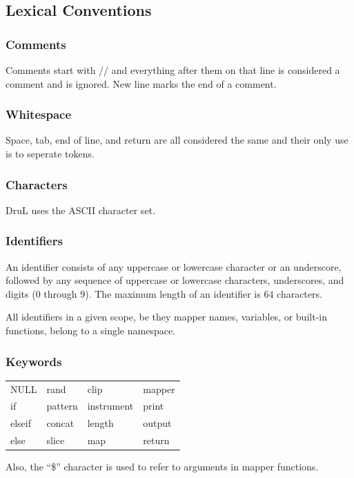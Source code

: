 \documentclass[11pt,twoside]{article}
\begin{document}
\subsection{Lexical Conventions}

\subsubsection{Comments}

Comments start with // and everything after them on that line
is considered a comment and is ignored. New line marks the end
of a comment.

\subsubsection{Whitespace}

Space, tab, end of line, and return are all considered the same 
and their only use is to seperate tokens.

\subsubsection{Characters}

DruL uses the ASCII character set.

\subsubsection{Identifiers}

An identifier consists of any uppercase or lowercase character
or an underscore, followed by any sequence of uppercase or lowercase characters,
underscores, and digits ($0$ through $9$). The maximum length of an identifier
is $64$ characters.

All identifiers in a given scope, be they mapper names, variables, or built-in functions, belong to a single namespace.

\subsubsection{Keywords}

\begin{table}[htb]
\begin{center} 
\begin{tabular}{llll} 
  NULL   & rand    & clip       & mapper \\
  if     & pattern & instrument & print  \\
  elseif & concat  & length     & output \\
  else   & slice   & map        & return
\end{tabular}
\label{tab:keywords}
\end{center} 
\end{table}
Also, the ``\$'' character is used to refer to arguments in mapper functions.
\end{document}
